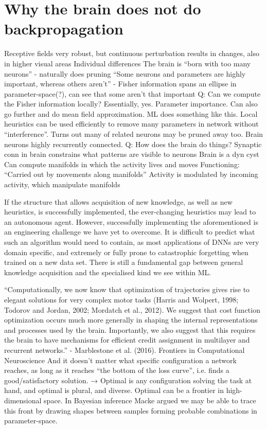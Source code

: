 \documentclass[mphil,deptreport,ai]{infthesis} %
\begin{document}
\chapter{Why the brain does not do backpropagation}

Receptive fields very robust, but continuous perturbation results in changes, also in higher visual areas
Individual differences
The brain is “born with too many neurons” - naturally does pruning
“Some neurons and parameters are highly important, whereas others aren’t” - Fisher information spans an ellipse in parameter-space(?), can see that some aren’t that important
Q: Can we compute the Fisher information locally? Essentially, yes. Parameter importance. Can also go further and do mean field approximation. ML does something like this. Local heuristics can be used efficiently to remove many parameters in network without “interference”. Turns out many of related neurons may be pruned away too.
Brain neurons highly recurrently connected.
Q: How does the brain do things?
Synaptic conn in brain constrains what patterns are visible to neurons
Brain is a dyn cyst
Can compute manifolds in which the activity lives and moves
Functioning: “Carried out by movements along manifolds”
Activity is modulated by incoming activity, which manipulate manifolds


If the structure that allows acquisition of new knowledge, as well as new heuristics, is successfully implemented, the ever-changing heuristics may lead to an autonomous agent. 
However, successfully implementing the aforementioned is an engineering challenge we have yet to overcome. It is difficult to predict what such an algorithm would need to contain, as most applications of DNNs are very domain specific, and extremely or fully prone to catastrophic forgetting when trained on a new data set.
There is still a fundamental gap between general knowledge acquisition and the specialised kind we see within ML.


“Computationally, we now know that optimization of trajectories gives rise to elegant solutions for very complex motor tasks (Harris and Wolpert, 1998; Todorov and Jordan, 2002; Mordatch et al., 2012). We suggest that cost function optimization occurs much more generally in shaping the internal representations and processes used by the brain. Importantly, we also suggest that this requires the brain to have mechanisms for efficient credit assignment in multilayer and recurrent networks.” - Marblestone et al. (2016). Frontiers in Computational Neuroscience
And it doesn’t matter what specific configuration a network reaches, as long as it reaches “the bottom of the loss curve”, i.e. finds a good/satisfactory solution. → Optimal is any configuration solving the task at hand, and optimal is plural, and diverse. Optimal can be a frontier in high-dimensional space. In Bayesian inference Macke argued we may be able to trace this front by drawing shapes between samples forming probable combinations in parameter-space.
\end{document}
